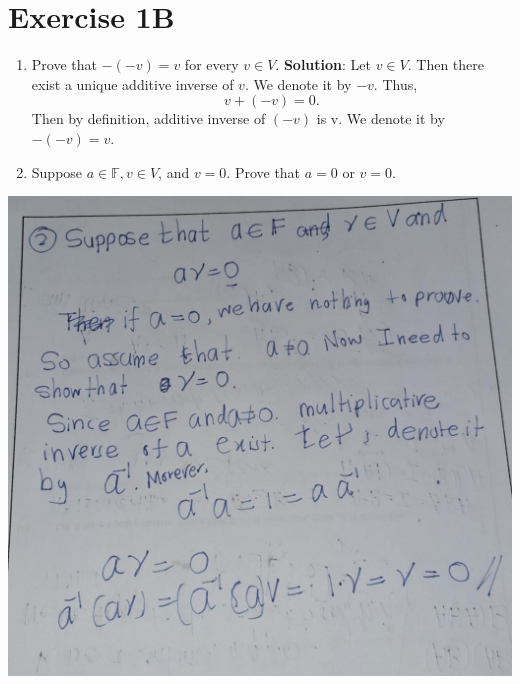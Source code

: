 \documentclass[
]{book}
\theoremstyle{definition}
\theoremstyle{definition}
\theoremstyle{definition}
\theoremstyle{definition}
\theoremstyle{remark}
\begin{document}
\section{Exercise 1B}\label{exercise-1b}

\begin{enumerate}
\def\labelenumi{\arabic{enumi}.}
\item
  Prove that \(−(−v) = v\) for every \(v\in V\).
  \textbf{Solution}:
  Let \(v\in V\). Then there exist a unique additive inverse of \(v\). We denote it by \(-v\). Thus,
  \[v+(-v)=0.\] Then by definition, additive inverse of \((-v)\) is v. We denote it by \(-(-v)=v\).
\item
  Suppose \(a \in \mathbb{F} ,v\in V\), and \(v= 0\). Prove that \(a=0\) or \(v=0\).
\end{enumerate}

\includegraphics{fig/Ex1B/Ex2.jpg}
\end{document}
